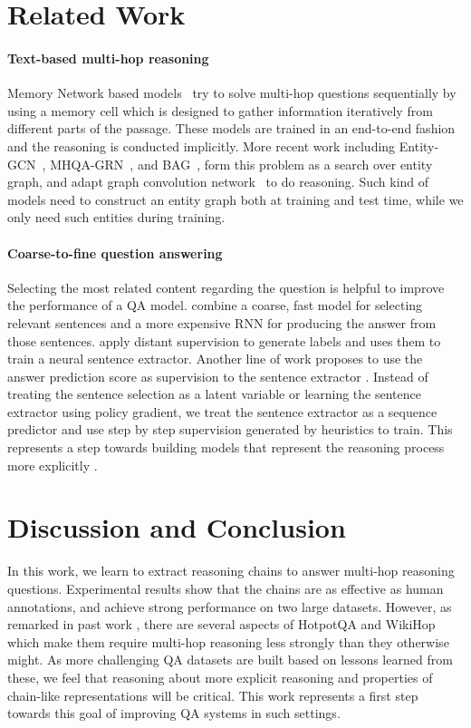\documentclass[11pt,a4paper]{article}
\begin{document}
\section{Related Work}

\paragraph{Text-based multi-hop reasoning}
Memory Network based models~\citep{weston2015towards,sukhbaatar2015end,kumar2016ask,dhingra2016gated,shen2017reasonet} try to solve multi-hop questions sequentially by using a memory cell which is designed to gather information iteratively from different parts of the passage. These models are trained in an end-to-end fashion and the reasoning is conducted implicitly. More recent work including Entity-GCN~\citep{de2018question}, MHQA-GRN~\citep{song2018exploring}, and BAG~\citep{cao2019bag}, form this problem as a search over entity graph, and adapt graph convolution network~\cite{kipf2017semi} to do reasoning. Such kind of models need to construct an entity graph both at training and test time, while we only need such entities during training.

\paragraph{Coarse-to-fine question answering}
Selecting the most related content regarding the question is helpful to improve the performance of a QA model.  combine a coarse, fast model for selecting relevant sentences and a more expensive RNN for producing the answer from those sentences.  apply distant supervision to generate labels and uses them to train a neural sentence extractor. Another line of work proposes to use the answer prediction score as supervision to the sentence extractor \citep{wang2018r,indurthi2018cut,min2018efficient}. Instead of treating the sentence selection as a latent variable or learning the sentence extractor using policy gradient, we treat the sentence extractor as a sequence predictor and use step by step supervision generated by heuristics to train. This represents a step towards building models that represent the reasoning process more explicitly \citep{trivedi2019repurposing, jiang2019explore}.

\section{Discussion and Conclusion}
In this work, we learn to extract reasoning chains to answer multi-hop reasoning questions. Experimental results show that the chains are as effective as human annotations, and achieve strong performance on two large datasets. However, as remarked in past work \citep{chen2019understanding,min2019compositional}, there are several aspects of HotpotQA and WikiHop which make them require multi-hop reasoning less strongly than they otherwise might. As more challenging QA datasets are built based on lessons learned from these, we feel that reasoning about more explicit reasoning and properties of chain-like representations will be critical. This work represents a first step towards this goal of improving QA systems in such settings.



\end{document}
